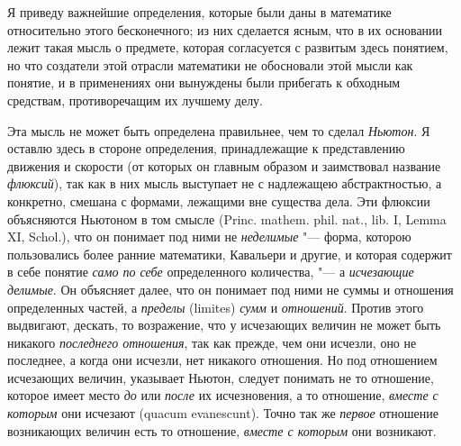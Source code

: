 {Я приведу важнейшие определения, которые были даны в математике относительно
этого бесконечного; из них сделается ясным, что в их основании лежит такая
мысль о предмете, которая согласуется с развитым здесь понятием, но что
создатели этой отрасли математики не обосновали этой мысли как понятие, и в
применениях они вынуждены были прибегать к обходным средствам,
противоречащим их лучшему делу.

Эта мысль не может быть определена правильнее, чем то сделал
{\em Ньютон}. Я оставлю здесь в стороне определения,
принадлежащие к представлению движения и скорости (от которых он главным
образом и заимствовал название {\em флюксий}), так как
в них мысль выступает не с надлежащею абстрактностью, а конкретно, смешана
с формами, лежащими вне существа дела. Эти флюксии объясняются Ньютоном в
том смысле
(Princ. mathem. phil. nat., lib. I, Lemma XI, Schol.),
что он понимает под ними не
{\em неделимые} "--- форма, которою пользовались более
ранние математики, Кавальери и другие, и которая содержит в себе понятие
{\em само по себе} определенного количества, "--- а
{\em исчезающие делимые}. Он объясняет далее, что он
понимает под ними не суммы и отношения определенных частей, а
{\em пределы} (limites) {\em сумм}
и {\em отношений}. Против этого выдвигают, дескать, то
возражение, что у исчезающих величин не может быть никакого
{\em последнего отношения}, так как прежде, чем они
исчезли, оно не последнее, а когда они исчезли, нет никакого отношения. Но
под отношением исчезающих величин, указывает Ньютон, следует понимать не то
отношение, которое имеет место {\em до} или
{\em после} их исчезновения, а то отношение,
{\em вместе с которым} они исчезают (quacum
evanescunt). Точно так же {\em первое} отношение
возникающих величин есть то отношение, {\em вместе с
которым} они возникают.

}
